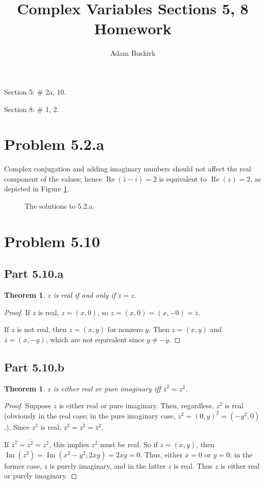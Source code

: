\documentclass{article}
\title{Complex Variables Sections 5, 8 Homework}
\author{Adam Buskirk}
\newtheorem{theorem}[subsection]{Theorem}
\theoremstyle{definition}
\begin{document}
\maketitle

Section 5: \# 2a, 10.

Section 8: \# 1, 2.

\section{Problem 5.2.a}
Complex conjugation and adding imaginary numbers should not affect the real component of
the values; hence $\operatorname{Re}(\bar{z}-i)=2$ is equivalent to 
$\operatorname{Re}(z)=2$, as depicted in Figure \ref{5-2-a}.
\begin{figure}[h]
\centering
{}
\caption{The solutions to 5.2.a.}\label{5-2-a}
\end{figure}

\section{Problem 5.10}
\subsection{Part 5.10.a}
\begin{theorem}
$z$ is real if and only if $\bar{z}=z$.
\end{theorem}
\begin{proof}
If $z$ is real, $z=(x,0)$, so $z=(x,0)=(x,-0)=\bar{z}$.

If $z$ is not real, then $z=(x,y)$ for nonzero $y$. Then $z=(x,y)$ and $\bar{z}=(x,-y)$, 
which are not equivalent since $y \neq -y$.
\end{proof}
\subsection{Part 5.10.b}
\begin{theorem}
$z$ is either real or pure imaginary iff $\bar{z}^2=z^2$.
\end{theorem}
\begin{proof}
Suppose $z$ is either real or pure imaginary. Then, regardless, $z^2$ is real (obviously in the real
case; in the pure imaginary case, $z^2=(0,y)^2=(-y^2,0)$.). Since 
$z^2$ is real, $z^2 = \overline{z^2} = \bar{z}^2$.

If $\bar{z}^2 = \overline{z^2} = z^2$, this implies $z^2$ must be real. So if $z=(x,y)$, then 
$\operatorname{Im}(z^2) = \operatorname{Im}(x^2-y^2,2xy)=2xy=0$. Thus, either $x=0$ or $y=0$; 
in the former case, $z$ is purely imaginary, and in the latter $z$ is real. Thus $z$ is either
real or purely imaginary.
\end{proof}
\end{document}
